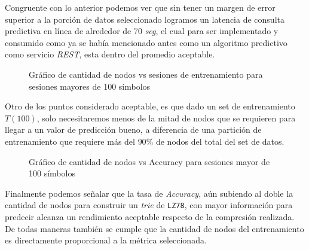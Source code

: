 	Congruente con lo anterior podemos ver que sin tener un margen de error superior a la porción de datos seleccionado logramos un latencia de consulta predictiva en línea de alrededor de 70 \emph{seg}, el cual para ser implementado y consumido como ya se había mencionado antes como un algoritmo predictivo como servicio \emph{REST}, esta dentro del promedio aceptable.

	\begin{figure}[h] 
		\centering
		\caption{Gráfico de cantidad de nodos vs sesiones de entrenamiento para sesiones mayores de 100 símbolos}
	  \label{fig:sim}
	\end{figure}


	Otro de los puntos  considerado aceptable, es que dado un set de entrenamiento $T(100)$, solo necesitaremos menos de la mitad de nodos que se requieren para llegar a un valor de predicción bueno, a diferencia de una partición de entrenamiento que requiere más del $90\%$ de nodos del total del set de datos.\\
	

	
	\begin{figure}[h] 
		\centering
			\caption{Gráfico de cantidad de nodos vs Accuracy para sesiones mayor de 100 símbolos}
		\label{fig:sim}
	\end{figure}



	Finalmente podemos señalar que la tasa de \emph{Accuracy}, aún  subiendo al doble la cantidad de nodos para construir un \emph{trie} de \texttt{LZ78}, con mayor información  para predecir alcanza un rendimiento aceptable respecto de la compresión realizada. De todas maneras también se cumple que la cantidad de nodos del entrenamiento es directamente proporcional a la métrica seleccionada.